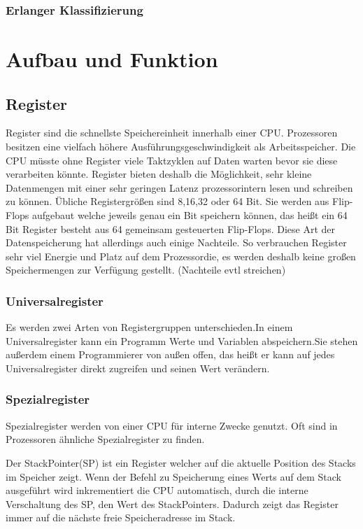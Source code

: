 \documentclass[12pt]{article}
\begin{document}
\subsubsection{Erlanger Klassifizierung}


\section{Aufbau und Funktion}
\subsection{Register}
Register sind die schnellste Speichereinheit innerhalb einer CPU. Prozessoren besitzen eine vielfach höhere Ausführungsgeschwindigkeit als Arbeitsspeicher. Die CPU müsste ohne Register viele Taktzyklen auf Daten warten bevor sie diese verarbeiten könnte. Register bieten deshalb die Möglichkeit, sehr kleine Datenmengen mit einer sehr geringen Latenz prozessorintern lesen und schreiben zu können. Übliche Registergrößen sind 8,16,32 oder 64 Bit.\cite{mikroprozessortechnik2011} Sie werden aus Flip-Flops aufgebaut welche jeweils genau ein Bit speichern können, das heißt ein 64 Bit Register besteht aus 64 gemeinsam gesteuerten Flip-Flops.\cite{mikroprozessortechnik2011} Diese Art der Datenspeicherung hat allerdings auch einige Nachteile. So verbrauchen Register sehr viel Energie und Platz auf dem Prozessordie, es werden deshalb keine großen Speichermengen zur Verfügung gestellt. (Nachteile evtl streichen)

\subsubsection{Universalregister}
Es werden zwei Arten von Registergruppen unterschieden.In einem Universalregister kann ein Programm Werte und Variablen abspeichern.Sie stehen außerdem einem Programmierer von außen offen, das heißt er kann auf jedes Universalregister direkt zugreifen und seinen Wert verändern.

\subsubsection{Spezialregister}
Spezialregister werden von einer CPU für interne Zwecke genutzt. Oft sind in Prozessoren ähnliche Spezialregister zu finden. 

Der StackPointer(SP) ist ein Register welcher auf die aktuelle Position des Stacks im Speicher zeigt. Wenn der Befehl zu Speicherung eines Werts auf dem Stack ausgeführt wird inkrementiert die CPU automatisch, durch die interne Verschaltung des SP, den Wert des StackPointers. Dadurch zeigt das Register immer auf die nächste freie Speicheradresse im Stack.
\end{document}
